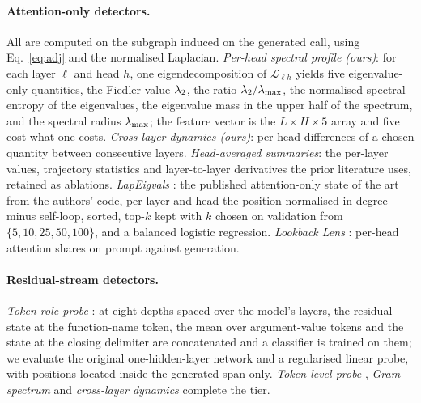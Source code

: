 \paragraph{Attention-only detectors.}
\label{sec:method:attn}
All are computed on the subgraph induced on the generated call, using Eq.~\ref{eq:adj} and the normalised
Laplacian. \emph{Per-head spectral profile (ours)}: for each layer $\ell$ and head $h$, one eigendecomposition
of $\mathcal{L}_{\ell h}$ yields five eigenvalue-only quantities, the Fiedler value $\lambda_{2}$, the ratio
$\lambda_{2}/\lambda_{\max}$, the normalised spectral entropy of the eigenvalues, the eigenvalue mass in the upper half of
the spectrum, and the spectral radius $\lambda_{\max}$; the feature vector is the $L\times H\times 5$ array and five
cost what one costs. \emph{Cross-layer dynamics (ours)}: per-head differences of a chosen quantity between
consecutive layers. \emph{Head-averaged summaries}: the per-layer values, trajectory statistics and
layer-to-layer derivatives the prior literature uses, retained as ablations. \emph{LapEigvals}
\citep{binkowski2025lapeigvals}: the published attention-only state of the art from the authors' code, per
layer and head the position-normalised in-degree minus self-loop, sorted, top-$k$ kept with $k$ chosen on
validation from $\{5,10,25,50,100\}$, and a balanced logistic regression. \emph{Lookback Lens}
\citep{chuang2024lookback}: per-head attention shares on prompt against generation.

\paragraph{Residual-stream detectors.}
\label{sec:method:resid}
\emph{Token-role probe} \citep{healy2026internal}: at eight depths spaced over the model's layers, the residual
state at the function-name token, the mean over argument-value tokens and the state at the closing delimiter
are concatenated and a classifier is trained on them; we evaluate the original one-hidden-layer network and a
regularised linear probe, with positions located inside the generated span only. \emph{Token-level probe}
\citep{obeso2025realtime}, \emph{Gram spectrum} \citep{chen2024inside} and \emph{cross-layer dynamics}
\citep{icrprobe2025} complete the tier.

